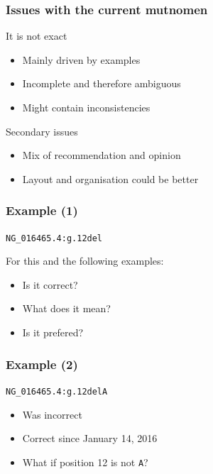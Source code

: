 \documentclass[14pt]{beamer}
\begin{document}
\begin{frame}
  \frametitle{Issues with the current \textcolor{hgvs}{mutnomen}}

  \begin{block}{It is not exact}
    \begin{itemize}
      \item Mainly driven by examples
      \item Incomplete and therefore ambiguous
      \item Might contain inconsistencies
    \end{itemize}
  \end{block}

  \begin{block}{Secondary issues}
    \begin{itemize}
      \item Mix of recommendation and opinion
      \item Layout and organisation could be better
    \end{itemize}
  \end{block}
\end{frame}


\begin{frame}[fragile]
  \frametitle{Example (1)}

  \begin{alltt}
    NG_016465.4:g.12del
  \end{alltt}

  For this and the following examples:
  \begin{itemize}
    \item Is it correct?
    \item What does it mean?
    \item Is it prefered?
  \end{itemize}
\end{frame}


\begin{frame}[fragile]
  \frametitle{Example (2)}

  \begin{alltt}
    NG_016465.4:g.12del\textcolor{hgvs}{A}
  \end{alltt}

  \pause
  \begin{itemize}
    \item Was \textcolor{hgvs}{incorrect}
    \item \textcolor{hgvs}{Correct} since January 14, 2016
    \item What if position 12 is not \verb|A|?
  \end{itemize}
\end{frame}
\end{document}

